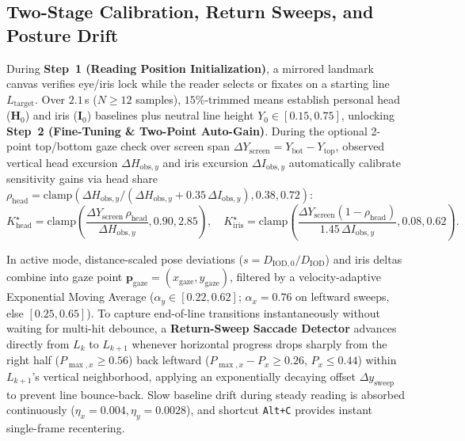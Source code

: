 \documentclass[conference]{IEEEtran}
\begin{document}
\subsection{Two-Stage Calibration, Return Sweeps, and Posture Drift}
During \textbf{Step~1 (Reading Position Initialization)}, a mirrored landmark canvas verifies eye/iris lock while the reader selects or fixates on a starting line $L_{\text{target}}$. Over $2.1$\,s ($N \ge 12$ samples), $15\%$-trimmed means establish personal head ($\mathbf{H}_0$) and iris ($\mathbf{I}_0$) baselines plus neutral line height $Y_0 \in [0.15, 0.75]$, unlocking \textbf{Step~2 (Fine-Tuning \& Two-Point Auto-Gain)}. During the optional 2-point top/bottom gaze check over screen span $\Delta Y_{\text{screen}} = Y_{\text{bot}} - Y_{\text{top}}$, observed vertical head excursion $\Delta H_{\text{obs},y}$ and iris excursion $\Delta I_{\text{obs},y}$ automatically calibrate sensitivity gains via head share $\rho_{\text{head}} = \text{clamp}(\Delta H_{\text{obs},y} / (\Delta H_{\text{obs},y} + 0.35\,\Delta I_{\text{obs},y}), 0.38, 0.72)$:
\begin{equation}
    K_{\text{head}}^{\star} = \text{clamp}\!\left(\frac{\Delta Y_{\text{screen}}\,\rho_{\text{head}}}{\Delta H_{\text{obs},y}}, 0.90, 2.85\right), \quad
    K_{\text{iris}}^{\star} = \text{clamp}\!\left(\frac{\Delta Y_{\text{screen}}(1 - \rho_{\text{head}})}{1.45\,\Delta I_{\text{obs},y}}, 0.08, 0.62\right).
\end{equation}

In active mode, distance-scaled pose deviations ($s = D_{\text{IOD},0}/D_{\text{IOD}}$) and iris deltas combine into gaze point $\mathbf{p}_{\text{gaze}} = (x_{\text{gaze}}, y_{\text{gaze}})$, filtered by a velocity-adaptive Exponential Moving Average ($\alpha_y \in [0.22, 0.62]$; $\alpha_x = 0.76$ on leftward sweeps, else $[0.25, 0.65]$). To capture end-of-line transitions instantaneously without waiting for multi-hit debounce, a \textbf{Return-Sweep Saccade Detector} advances directly from $L_k$ to $L_{k+1}$ whenever horizontal progress drops sharply from the right half ($P_{\max,x} \ge 0.56$) back leftward ($P_{\max,x} - P_x \ge 0.26$, $P_x \le 0.44$) within $L_{k+1}$'s vertical neighborhood, applying an exponentially decaying offset $\Delta y_{\text{sweep}}$ to prevent line bounce-back. Slow baseline drift during steady reading is absorbed continuously ($\eta_x = 0.004, \eta_y = 0.0028$), and shortcut \texttt{Alt+C} provides instant single-frame recentering.
\end{document}

